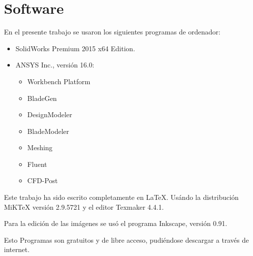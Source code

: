 \chapter*{Software} %

\linespread{1.3}
En el presente trabajo se usaron los siguientes programas de ordenador:

\begin{itemize}
\item SolidWorks Premium 2015 x64 Edition.
\item ANSYS Inc., versión 16.0:
\begin{itemize}
\item Workbench Platform
\item BladeGen
\item DesignModeler
\item BladeModeler
\item Meshing
\item Fluent
\item CFD-Post
\end{itemize} 
\end{itemize}

Este trabajo ha sido escrito completamente en \LaTeX. Usándo la distribución MiKTeX versión 2.9.5721 y el editor Texmaker 4.4.1.

Para la edición de las imágenes se usó el programa Inkscape, versión 0.91.

Esto Programas son gratuitos y de libre acceso, pudiéndose descargar a través de internet.  

\clearpage %